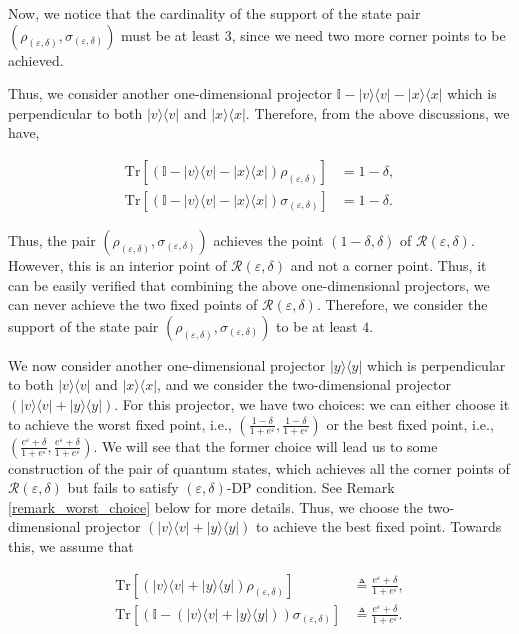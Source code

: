 \documentclass[onecolumn,ldraftcls, 11pt]{IEEEtran}
\newcommand{\tr}{\mathrm{Tr}}
\newcommand{\ketbra}[1]{|#1\rangle\langle#1|}
\newcommand{\eps}{\varepsilon}
\newcommand*{\bbI}{\mathbb{I}}
\newcommand*{\cR}{\mathcal{R}}
\begin{document}
Now, we notice that the cardinality of the support of the state pair $(\rho_{(\eps,\delta)},\sigma_{(\eps,\delta)})$ must be at least $3$, since we need two more corner points to be achieved.

Thus, we consider another one-dimensional projector $\bbI - \ketbra{v} - \ketbra{x}$ which is perpendicular to both $\ketbra{v}$ and $\ketbra{x}$. Therefore, from the above discussions, we have,

\begin{align}
    \tr[\left(\bbI - \ketbra{v} - \ketbra{x}\right)\rho_{(\eps,\delta)}] &= 1-\delta, \label{xvcketrho}\\
    \tr[\left(\bbI - \ketbra{v} - \ketbra{x}\right)\sigma_{(\eps,\delta)}] &= 1 - \delta.\label{xvcketsig}
\end{align}


Thus, the pair $(\rho_{(\eps,\delta)},\sigma_{(\eps,\delta)})$ achieves the point $(1-\delta,\delta)$ of $\cR(\eps,\delta)$. However, this is an interior point of $\cR(\eps,\delta)$ and not a corner point. Thus, it can be easily verified that combining the above one-dimensional projectors, we can never achieve the two fixed points of $\cR(\eps,\delta)$. 
Therefore, we consider the support of the state pair $(\rho_{(\eps,\delta)},\sigma_{(\eps,\delta)})$ to be at least $4$.

We now consider another one-dimensional projector $\ketbra{y}$ which is perpendicular to both $\ketbra{v}$ and $\ketbra{x}$, and we consider the two-dimensional projector $(\ketbra{v} + \ketbra{y})$. For this projector, we have two choices: we can either choose it to achieve the worst fixed point, i.e., $(\frac{1-\delta}{1+e^\eps},\frac{1-\delta}{1+e^\eps})$ or the best fixed point, i.e., $(\frac{e^\eps + \delta}{1+e^\eps}, \frac{e^\eps + \delta}{1+e^\eps})$. We will see that the former choice will lead us to some construction of the pair of quantum states, which achieves all the corner points of $\cR(\eps,\delta)$ but fails to satisfy $(\eps,\delta)$-DP condition. See Remark \ref{remark_worst_choice} below for more details. Thus, we choose the two-dimensional projector $(\ketbra{v} + \ketbra{y})$ to achieve the best fixed point. Towards this, we assume that

\begin{align}
    \tr[(\ketbra{v} + \ketbra{y})\rho_{(\eps,\delta)}] &\triangleq \frac{e^\eps+\delta}{1+e^\eps}, \label{vyketrho}\\
    \tr[\left(\bbI - (\ketbra{v} + \ketbra{y})\right)\sigma_{(\eps,\delta)}] &\triangleq \frac{e^\eps+\delta}{1+e^\eps}.\label{vyketsig}
\end{align} 
\end{document}
